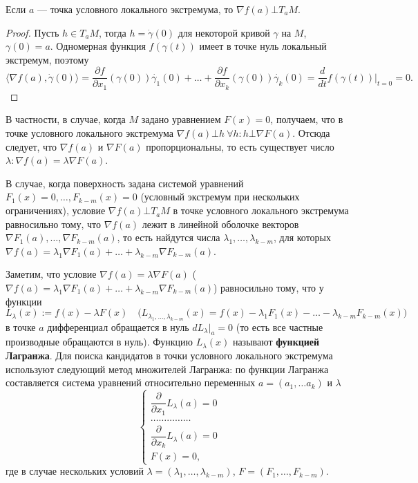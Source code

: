\documentclass[a4paper]{article}
\theoremstyle{named}
\begin{document}
    \begin{proposal*}
        Если $a$ --- точка условного локального экстремума, то $\nabla f(a)\bot T_aM$.
    \end{proposal*}
    
    \begin{proof}
        Пусть $h\in T_aM$, тогда $h=\dot{\gamma}(0)$ для некоторой кривой $\gamma$ на $M$, $\gamma(0)=a$.
        Одномерная функция $f(\gamma(t))$ имеет в точке нуль локальный экстремум, поэтому
        $$
            \langle\nabla f(a), \dot{\gamma}(0)\rangle =
            \dfrac{\partial f}{\partial x_1}(\gamma(0))\dot{\gamma_1}(0)+\ldots+
            \dfrac{\partial f}{\partial x_k}(\gamma(0))\dot{\gamma_k}(0)=
            \dfrac{d}{dt}f(\gamma(t))\bigl|_{t=0}=0.
        $$
    \end{proof}
    
    В частности, в случае, когда $M$ задано уравнением $F(x)=0$, получаем, что в точке условного локального экстремума $\nabla f(a)\bot h\ \forall h\colon h\bot \nabla F(a)$.
    Отсюда следует, что $\nabla f(a)$ и $\nabla F(a)$ пропорциональны, то есть существует число $\lambda\colon \nabla f(a)= \lambda\nabla F(a)$.
    
    В случае, когда поверхность задана системой уравнений $F_1(x)=0,\ldots, F_{k-m}(x)=0$ (условный экстремум при нескольких ограничениях), условие $\nabla f(a)\bot T_aM$ в точке условного локального экстремума равносильно тому, что $\nabla f(a)$ лежит в линейной оболочке векторов $\nabla F_1(a), \ldots, \nabla F_{k-m}(a)$, то есть найдутся числа $\lambda_1,\ldots, \lambda_{k-m}$, для которых
    $\nabla f(a) = \lambda_1\nabla F_1(a)+\ldots+\lambda_{k-m}\nabla F_{k-m}(a)$.
    
    Заметим, что условие $\nabla f(a)= \lambda\nabla F(a)$ ($\nabla f(a) = \lambda_1\nabla F_1(a)+\ldots+\lambda_{k-m}\nabla F_{k-m}(a)$) равносильно тому, что у функции
    $$
        L_\lambda(x):= f(x)-\lambda F(x)\quad\bigl(L_{\lambda_1,\ldots,\lambda_{k-m}}(x) = f(x)- \lambda_1F_1(x)-\ldots-\lambda_{k-m}F_{k-m}(x)\bigr)
    $$
    в точке $a$ дифференциал обращается в нуль $dL_\lambda\bigl|_a=0$ (то есть все частные производные обращаются в нуль).
    Функцию $L_\lambda(x)$ называют \textbf{функцией Лагранжа}. Для поиска кандидатов в точки условного локального экстремума используют следующий метод множителей Лагранжа:
    по функции Лагранжа составляется система уравнений относительно переменных $a=(a_1,\ldots a_k)$ и $\lambda$
    $$
        \begin{cases}
            \dfrac{\partial}{\partial x_1}L_\lambda(a)=0\\
              \ldots\ldots\ldots\ldots\ldots\\
            \dfrac{\partial }{\partial x_k}L_\lambda(a)=0\\
            F(x)=0,
        \end{cases}
    $$
    где в случае нескольких условий $\lambda = (\lambda_1,\ldots,\lambda_{k-m})$, $F=(F_1,\ldots, F_{k-m})$.
    
\end{document}
